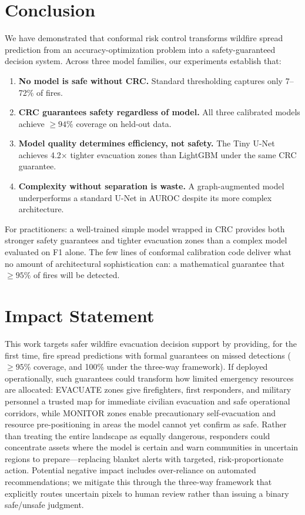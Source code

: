 \documentclass{article}
\begin{document}

\section{Conclusion}

We have demonstrated that conformal risk control transforms wildfire spread prediction from an accuracy-optimization problem into a safety-guaranteed decision system.
Across three model families, our experiments establish that:
\begin{enumerate}
    \item \textbf{No model is safe without CRC.}  Standard thresholding captures only 7--72\% of fires.
    \item \textbf{CRC guarantees safety regardless of model.}  All three calibrated models achieve ${\ge}94\%$ coverage on held-out data.
    \item \textbf{Model quality determines efficiency, not safety.}  The Tiny U-Net achieves 4.2$\times$ tighter evacuation zones than LightGBM under the same CRC guarantee.
    \item \textbf{Complexity without separation is waste.}  A graph-augmented model underperforms a standard U-Net in AUROC despite its more complex architecture.
\end{enumerate}

For practitioners: a well-trained simple model wrapped in CRC provides both stronger safety guarantees and tighter evacuation zones than a complex model evaluated on F1 alone.
The few lines of conformal calibration code deliver what no amount of architectural sophistication can: a mathematical guarantee that ${\ge}95\%$ of fires will be detected.

\section*{Impact Statement}
This work targets safer wildfire evacuation decision support by providing, for the first time, fire spread predictions with formal guarantees on missed detections (${\ge}95\%$ coverage, and 100\% under the three-way framework).
If deployed operationally, such guarantees could transform how limited emergency resources are allocated: EVACUATE zones give firefighters, first responders, and military personnel a trusted map for immediate civilian evacuation and safe operational corridors, while MONITOR zones enable precautionary self-evacuation and resource pre-positioning in areas the model cannot yet confirm as safe.
Rather than treating the entire landscape as equally dangerous, responders could concentrate assets where the model is certain and warn communities in uncertain regions to prepare---replacing blanket alerts with targeted, risk-proportionate action.
Potential negative impact includes over-reliance on automated recommendations; we mitigate this through the three-way framework that explicitly routes uncertain pixels to human review rather than issuing a binary safe/unsafe judgment.
\end{document}
